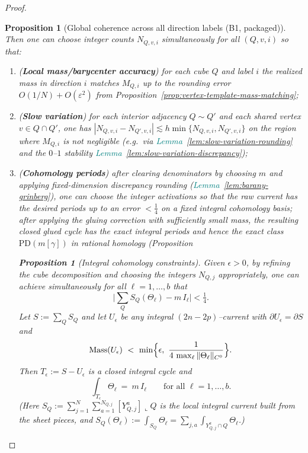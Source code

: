 \documentclass[11pt]{article}
\newcommand{\REVMZ}[1]{\textcolor{teal}{#1}}  %
\numberwithin{equation}{section}  %
\theoremstyle{plain}
\newtheorem{proposition}[theorem]{Proposition}
\theoremstyle{definition}
\theoremstyle{remark}
\DeclareMathOperator{\Mass}{Mass}
\begin{document}
\begin{proof}
\begin{proposition}[Global coherence across all direction labels (B1, packaged)]
\smallskip\noindent
Then one can choose integer counts $N_{Q,v,i}$ simultaneously for all $(Q,v,i)$ so that:
\begin{enumerate}
\item[\textnormal{(a)}] (\textbf{Local mass/barycenter accuracy}) for each cube $Q$ and label $i$ the realized mass in direction $i$ matches $M_{Q,i}$
up to the rounding error $O(1/N)+O(\varepsilon^2)$ from Proposition~\ref{prop:vertex-template-mass-matching};
\item[\textnormal{(b)}] (\textbf{Slow variation}) for each interior adjacency $Q\sim Q'$ and each shared vertex $v\in Q\cap Q'$, one has
$|N_{Q,v,i}-N_{Q',v,i}|\lesssim h\min\{N_{Q,v,i},N_{Q',v,i}\}$ on the region where $M_{Q,i}$ is not negligible (e.g.\ via \REVMZ{Lemma~\ref{lem:slow-variation-rounding}}
and the $0$--$1$ stability \REVMZ{Lemma~\ref{lem:slow-variation-discrepancy}});
\item[\textnormal{(c)}] (\textbf{Cohomology periods}) after clearing denominators by choosing $m$ and applying fixed-dimension discrepancy rounding
(\REVMZ{Lemma~\ref{lem:barany-grinberg}}), one can choose the integer activations so that the \emph{raw} current has the desired periods up to an error $<\tfrac14$
on a fixed integral cohomology basis; after applying the gluing correction with sufficiently small mass, the resulting \emph{closed} glued cycle has the
exact integral periods and hence the exact class $\mathrm{PD}(m[\gamma])$ in rational homology (Proposition~

\begin{proposition}[Integral cohomology constraints]\label{prop:cohomology-match}
Given $\epsilon>0$, by refining the cube decomposition and choosing the
integers $N_{Q,j}$ appropriately, one can achieve simultaneously for all
$\ell=1,\ldots,b$ that
\[
\biggl|\sum_Q S_Q(\Theta_\ell) - m\,I_\ell\biggr| < \tfrac14.
\]
Let $S:=\sum_Q S_Q$ and let $U_\epsilon$ be any integral $(2n-2p)$--current with $\partial U_\epsilon=\partial S$ and
\[
\Mass(U_\epsilon)\ <\ \min\Bigl\{\epsilon,\ \frac{1}{4\,\max_\ell\|\Theta_\ell\|_{C^0}}\Bigr\}.
\]
Then $T_\epsilon:=S-U_\epsilon$ is a closed integral cycle and
\[
\int_{T_\epsilon}\Theta_\ell\ =\ m\,I_\ell\qquad\text{for all }\ell=1,\dots,b.
\]
(Here $S_Q:=\sum_{j=1}^N\sum_{a=1}^{N_{Q,j}}[Y_{Q,j}^a]\llcorner Q$ is the local integral current built from the sheet pieces, and $S_Q(\Theta_\ell):=\int_{S_Q}\Theta_\ell=\sum_{j,a}\int_{Y_{Q,j}^a\cap Q}\Theta_\ell$.)


\end{proposition}
\end{enumerate}
\end{proposition}
\end{proof}
\end{document}
